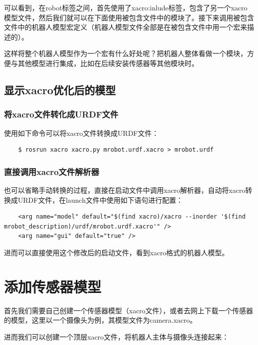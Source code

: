 \documentclass[9pt, oneside]{book}
\begin{document}
可以看到，在robot标签之间，首先使用了xacro:inlude标签，包含了另一个xacro模型文件，然后我们就可以在下面使用被包含文件中的模块了。接下来调用被包含文件中的机器人模型宏定义（机器人模型文件全部是在被包含文件中用一个宏来描述的）。

这样将整个机器人模型作为一个宏有什么好处呢？把机器人整体看做一个模块，方便与其他模型进行集成，比如在后续安装传感器等其他模块时。

\subsection{显示xacro优化后的模型}

\subsubsection{将xacro文件转化成URDF文件}

使用如下命令可以将xacro文件转换成URDF文件：

\begin{verbatim}
    $ rosrun xacro xacro.py mrobot.urdf.xacro > mrobot.urdf
\end{verbatim}

\subsubsection{直接调用xacro文件解析器}

也可以省略手动转换的过程，直接在启动文件中调用xacro解析器，自动将xacro转换成URDF文件，在launch文件中使用如下语句进行配置：

\begin{verbatim}
    <arg name="model" default="$(find xacro)/xacro --inorder '$(find mrobot_description)/urdf/mrobot.urdf.xacro'" />
	<arg name="gui" default="true" />
\end{verbatim}

进而可以直接使用这个修改后的启动文件，看到xacro格式的机器人模型。

\section{添加传感器模型}

首先我们需要自己创建一个传感器模型（xacro文件），或者去网上下载一个传感器的模型，这里以一个摄像头为例，其模型文件为camera.xacro。

进而我们可以创建一个顶层xacro文件，将机器人主体与摄像头连接起来：
\end{document}
